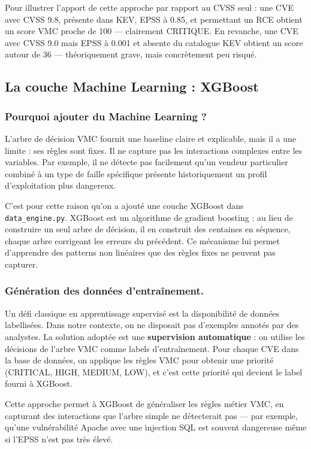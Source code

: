 \documentclass[runningheads]{llncs}
\begin{document}
Pour illustrer l'apport de cette approche par rapport au CVSS seul : une CVE avec CVSS 9.8, présente dans KEV, EPSS à 0.85, et permettant un RCE obtient un score VMC proche de 100 — clairement CRITIQUE. En revanche, une CVE avec CVSS 9.0 mais EPSS à 0.001 et absente du catalogue KEV obtient un score autour de 36 — théoriquement grave, mais concrètement peu risqué.

\subsection{La couche Machine Learning : XGBoost}

\subsubsection{Pourquoi ajouter du Machine Learning ?}

L'arbre de décision VMC fournit une baseline claire et explicable, mais il a une limite : ses règles sont fixes. Il ne capture pas les interactions complexes entre les variables. Par exemple, il ne détecte pas facilement qu'un vendeur particulier combiné à un type de faille spécifique présente historiquement un profil d'exploitation plus dangereux.

C'est pour cette raison qu'on a ajouté une couche XGBoost dans \texttt{data\_engine.py}. XGBoost est un algorithme de gradient boosting : au lieu de construire un seul arbre de décision, il en construit des centaines en séquence, chaque arbre corrigeant les erreurs du précédent. Ce mécanisme lui permet d'apprendre des patterns non linéaires que des règles fixes ne peuvent pas capturer.

\subsubsection{Génération des données d'entraînement.}

Un défi classique en apprentissage supervisé est la disponibilité de données labellisées. Dans notre contexte, on ne disposait pas d'exemples annotés par des analystes. La solution adoptée est une \textbf{supervision automatique} : on utilise les décisions de l'arbre VMC comme labels d'entraînement. Pour chaque CVE dans la base de données, on applique les règles VMC pour obtenir une priorité (CRITICAL, HIGH, MEDIUM, LOW), et c'est cette priorité qui devient le label fourni à XGBoost.

Cette approche permet à XGBoost de généraliser les règles métier VMC, en capturant des interactions que l'arbre simple ne détecterait pas — par exemple, qu'une vulnérabilité Apache avec une injection SQL est souvent dangereuse même si l'EPSS n'est pas très élevé.
\end{document}
